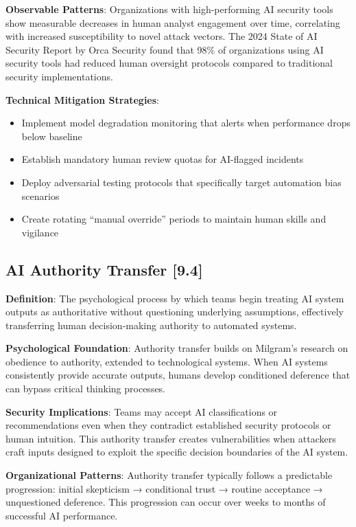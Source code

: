 \documentclass[11pt,a4paper]{article}
\begin{document}
\textbf{Observable Patterns}: Organizations with high-performing AI security tools show measurable decreases in human analyst engagement over time, correlating with increased susceptibility to novel attack vectors. The 2024 State of AI Security Report by Orca Security found that 98\% of organizations using AI security tools had reduced human oversight protocols compared to traditional security implementations\cite{orca2024}.

\textbf{Technical Mitigation Strategies}:
\begin{itemize}
\item Implement model degradation monitoring that alerts when performance drops below baseline
\item Establish mandatory human review quotas for AI-flagged incidents
\item Deploy adversarial testing protocols that specifically target automation bias scenarios
\item Create rotating ``manual override'' periods to maintain human skills and vigilance
\end{itemize}

\subsection{AI Authority Transfer [9.4]}

\textbf{Definition}: The psychological process by which teams begin treating AI system outputs as authoritative without questioning underlying assumptions, effectively transferring human decision-making authority to automated systems.

\textbf{Psychological Foundation}: Authority transfer builds on Milgram's research on obedience to authority\cite{milgram1974}, extended to technological systems. When AI systems consistently provide accurate outputs, humans develop conditioned deference that can bypass critical thinking processes.

\textbf{Security Implications}: Teams may accept AI classifications or recommendations even when they contradict established security protocols or human intuition. This authority transfer creates vulnerabilities when attackers craft inputs designed to exploit the specific decision boundaries of the AI system.

\textbf{Organizational Patterns}: Authority transfer typically follows a predictable progression: initial skepticism → conditional trust → routine acceptance → unquestioned deference. This progression can occur over weeks to months of successful AI performance.
\end{document}
